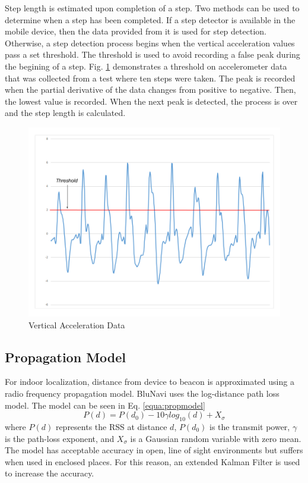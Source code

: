 \documentclass[conference]{IEEEtran}
\begin{document}
Step length is estimated upon completion of a step. Two methods can be used to determine when a step has been completed. If a step detector is available in the mobile device, then the data provided from it is used for step detection. Otherwise, a step detection process begins when the vertical acceleration values pass a set threshold. The threshold is used to avoid recording a false peak during the begining of a step. Fig. \ref{fig:accgraph} demonstrates a threshold on accelerometer data that was collected from a test where ten steps were taken. The peak is recorded when the partial derivative of the data changes from positive to negative. Then, the lowest value is recorded. When the next peak is detected, the process is over and the step length is calculated.

\begin{figure}[h]
\centering
\includegraphics[scale=0.25]{AccelerometerGraph.png}
\caption{Vertical Acceleration Data}
\captionsetup{justification=centering,margin=2cm}
\label{fig:accgraph}
\end{figure}

\subsection{Propagation Model}
For indoor localization, distance from device to beacon is approximated using a radio frequency propagation model. BluNavi uses the log-distance path loss model. The model can be seen in Eq. \ref{equa:propmodel}
\begin{equation}
\label{equa:propmodel}
P(d) = P(d_0) - 10{\gamma}log_{10}(d) + X_\sigma
\end{equation}
where $P(d)$ represents the RSS at distance $d$, $P(d_0)$ is the transmit power, $\gamma$ is the path-loss exponent, and $X_\sigma$ is a Gaussian random variable with zero mean. The model has acceptable accuracy in open, line of sight environments but suffers when used in enclosed places. For this reason, an extended Kalman Filter is used to increase the accuracy.
\end{document}

